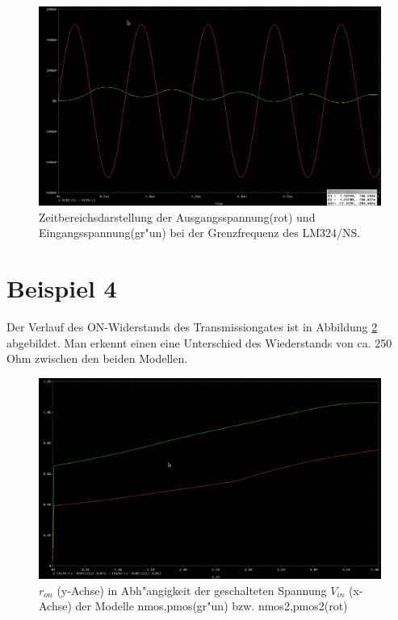 \begin{figure}[h!]
 \centering
 \includegraphics[width=16cm,keepaspectratio=true]{./fig/3_lm324ns_fgzeitbereich.png}
 \caption{Zeitbereichsdarstellung der Ausgangsspannung(rot) und Eingangsspannung(gr"un) bei der Grenzfrequenz des LM324/NS.}
 \label{fig:3_lm324ns_fgzeitbereich}
\end{figure}


\section{Beispiel 4}

Der Verlauf des ON-Widerstands des Transmissiongates ist in Abbildung \ref{fig:4_ron} abgebildet.
Man erkennt einen eine Unterschied des Wiederstands von ca. 250 Ohm zwischen den beiden Modellen.

\begin{figure}[h!]
 \centering
 \includegraphics[width=16cm,keepaspectratio=true]{./fig/4_ron.png}
 \caption{$r_{on}$ (y-Achse) in Abh"angigkeit der geschalteten Spannung $V_{in}$ (x-Achse) der Modelle
 nmos,pmos(gr"un) bzw. nmos2,pmos2(rot)}
 \label{fig:4_ron}
\end{figure}
